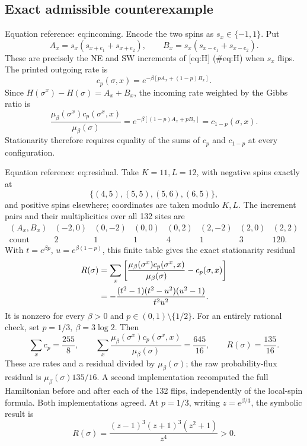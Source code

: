 \documentclass[10pt]{article}
\begin{document}
\subsection*{Exact admissible counterexample}
Equation reference: eq:incoming. Encode the two spins as \(s_x\in\{-1,1\}\). Put \[A_x=s_x(s_{x+e_1}+s_{x+e_2}),\qquad
 B_x=s_x(s_{x-e_1}+s_{x-e_2}).\] These are precisely the NE and SW increments of [eq:H] (\#eq:H) when \(s_x\) flips. The printed outgoing rate is \[c_p(\sigma,x)=e^{-\beta[pA_x+(1-p)B_x]}.\] Since \(H(\sigma^x)-H(\sigma)=A_x+B_x\), the incoming rate weighted by the Gibbs ratio is \[
 \frac{\mu_\beta(\sigma^x)c_p(\sigma^x,x)}
      {\mu_\beta(\sigma)}
 =e^{-\beta[(1-p)A_x+pB_x]}=c_{1-p}(\sigma,x).\] Stationarity therefore requires equality of the sums of \(c_p\) and \(c_{1-p}\) at every configuration.\par
Equation reference: eq:residual. Take \(K=11,L=12\), with negative spins exactly at \[\{(4,5),(5,5),(5,6),(6,5)\},\] and positive spins elsewhere; coordinates are taken modulo \(K,L\). The increment pairs and their multiplicities over all 132 sites are \[\begin{array}{c|rrrrrrr}
(A_x,B_x)&(-2,0)&(0,-2)&(0,0)&(0,2)&(2,-2)&(2,0)&(2,2)\\
\hline
\text{count}&2&1&1&4&1&3&120 .
\end{array}\] With \(t=e^{\beta p}\), \(u=e^{\beta(1-p)}\), this finite table gives the exact stationarity residual \[\begin{aligned}
 R(\sigma)
 &=\sum_x\left[
       \frac{\mu_\beta(\sigma^x)c_p(\sigma^x,x)}{\mu_\beta(\sigma)}
       -c_p(\sigma,x)\right]\notag\\
 &=-\frac{(t^2-1)(t^2-u^2)(u^2-1)}{t^2u^2}.
 \end{aligned}\] It is nonzero for every \(\beta>0\) and \(p\in(0,1)\setminus\{1/2\}\). For an entirely rational check, set \(p=1/3,\ \beta=3\log2\). Then \[\sum_xc_p=\frac{255}{8},\qquad
 \sum_x\frac{\mu_\beta(\sigma^x)c_p(\sigma^x,x)}{\mu_\beta(\sigma)}
   =\frac{645}{16},\qquad R(\sigma)=\frac{135}{16}.\] These are rates and a residual divided by \(\mu_\beta(\sigma)\); the raw probability-flux residual is \(\mu_\beta(\sigma)135/16\). A second implementation recomputed the full Hamiltonian before and after each of the 132 flips, independently of the local-spin formula. Both implementations agreed. At \(p=1/3\), writing \(z=e^{\beta/3}\), the symbolic result is \[R(\sigma)=\frac{(z-1)^3(z+1)^3(z^2+1)}{z^4}>0.\]\par
\end{document}
